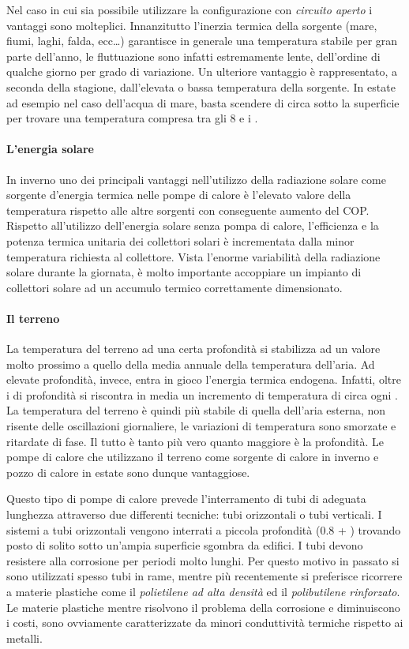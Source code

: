 Nel caso in cui sia possibile utilizzare la configurazione con \emph{circuito aperto} i vantaggi sono molteplici. Innanzitutto l'inerzia termica della sorgente (mare, fiumi, laghi, falda, ecc\dots) garantisce in generale una temperatura stabile per gran parte dell'anno, le fluttuazione sono infatti estremamente lente, dell'ordine di qualche giorno per grado di variazione. Un ulteriore vantaggio è rappresentato, a seconda della stagione, dall'elevata o bassa temperatura della sorgente. In estate ad esempio nel caso dell'acqua di mare, basta scendere di circa  sotto la superficie per trovare una temperatura compresa tra gli \num{8} e i .

\paragraph{L'energia solare}
In inverno uno dei principali vantaggi nell'utilizzo della radiazione solare come sorgente d'energia termica nelle pompe di calore è l'elevato valore della temperatura rispetto alle altre sorgenti con conseguente aumento del COP. Rispetto all'utilizzo dell'energia solare senza pompa di calore, l'efficienza e la potenza termica unitaria dei collettori solari è incrementata dalla minor temperatura richiesta al collettore. Vista l'enorme variabilità della radiazione solare durante la giornata, è molto importante accoppiare un impianto di collettori solare ad un accumulo termico correttamente dimensionato.

\paragraph{Il terreno}
La temperatura del terreno ad una certa profondità si stabilizza ad un valore molto prossimo a quello della media annuale della temperatura dell'aria. Ad elevate profondità, invece, entra in gioco l'energia termica endogena. Infatti, oltre i  di profondità si riscontra in media un incremento di temperatura di circa  ogni . La temperatura del terreno è quindi più stabile di quella dell'aria esterna, non risente delle oscillazioni giornaliere, le variazioni di temperatura sono smorzate e ritardate di fase. Il tutto è tanto più vero quanto maggiore è la profondità. Le pompe di calore che utilizzano il terreno come sorgente di calore in inverno e pozzo di calore in estate sono dunque vantaggiose.

Questo tipo di pompe di calore prevede l'interramento di tubi di adeguata lunghezza attraverso due differenti tecniche: tubi orizzontali o tubi verticali. I sistemi a tubi orizzontali vengono interrati a piccola profondità (\num{0.8} + ) trovando posto di solito sotto un'ampia superficie sgombra da edifici. I tubi devono resistere alla corrosione per periodi molto lunghi. Per questo motivo in passato si sono utilizzati spesso tubi in rame, mentre più recentemente si preferisce ricorrere a materie plastiche come il \emph{polietilene ad alta densità} ed il \emph{polibutilene rinforzato}. Le materie plastiche mentre risolvono il problema della corrosione e diminuiscono i costi, sono ovviamente caratterizzate da minori conduttività termiche rispetto ai metalli.

